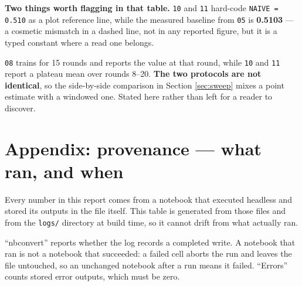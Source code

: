 \documentclass[11pt,a4paper]{article}
\newcommand{\keypoint}[1]{%
  \par\vspace{0.4em}%
  \noindent\colorbox{fed!8}{\parbox{0.98\textwidth}{\vspace{0.2em}#1\vspace{0.2em}}}%
  \par\vspace{0.4em}}
\begin{document}
\keypoint{\textbf{Two things worth flagging in that table.} \texttt{10} and \texttt{11} hard-code
\texttt{NAIVE = 0.510} as a plot reference line, while the measured baseline from \texttt{05} is
\textbf{0.5103} --- a cosmetic mismatch in a dashed line, not in any reported figure, but it is a typed
constant where a read one belongs.

\texttt{08} trains for 15 rounds and reports the value at that round, while \texttt{10} and
\texttt{11} report a plateau mean over rounds 8--20. \textbf{The two protocols are not identical}, so
the side-by-side comparison in Section \ref{sec:sweep} mixes a point estimate with a windowed one. Stated here rather
than left for a reader to discover.}

\section{Appendix: provenance --- what ran, and when}

Every number in this report comes from a notebook that executed headless and stored its outputs in the
file itself. This table is generated from those files and from the \texttt{logs/} directory at build
time, so it cannot drift from what actually ran.

``nbconvert'' reports whether the log records a completed write. A notebook that ran is not a notebook
that succeeded: a failed cell aborts the run and leaves the file untouched, so an unchanged notebook
after a run means it failed. ``Errors'' counts stored error outputs, which must be zero.
\end{document}
